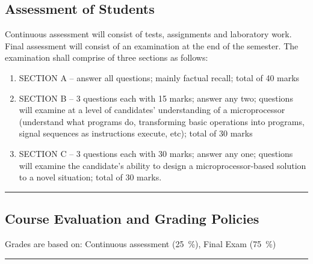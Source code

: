 \subsection*{Assessment of Students}
\begin{outline}
    \1 Continuous assessment will consist of tests, assignments and laboratory work.
    \1 Final assessment will consist of an examination at the end of the semester. The examination shall comprise of three sections as follows:
    \begin{enumerate}[label=\alph*)]
        \item SECTION A – answer all questions; mainly factual recall; total of 40 marks
        \item SECTION B – 3 questions each with 15 marks; answer any two; questions will examine at a level of candidates’ understanding of a microprocessor (understand what programs do, transforming basic operations into programs, signal sequences as instructions execute, etc); total of 30 marks
        \item SECTION C – 3 questions each with 30 marks; answer any one; questions will examine the candidate’s ability to design a microprocessor-based solution to a novel situation; total of 30 marks.
    \end{enumerate}
\end{outline}
\vspace{2ex}\hrule\vspace{2ex}

\subsection*{Course Evaluation and Grading Policies}
Grades are based on:
Continuous assessment (\qty{25}{\percent}),
Final Exam (\qty{75}{\percent})
\vspace{2ex}\hrule\vspace{2ex}



